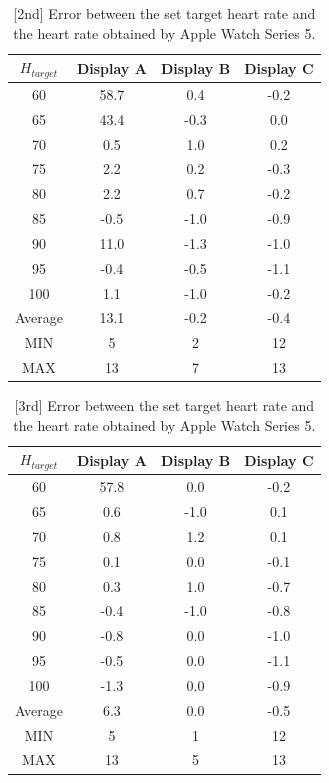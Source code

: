 \documentclass[sigchi,authordraft]{acmart}
\begin{document}
\begin{table}[!t]
  \centering
  \caption{[2nd] Error between the set target heart rate and the heart rate obtained by Apple Watch Series 5.}
  \begin{tabular}{c|c|c|c} \hline\hline
    $H_{target}$ & Display A & Display B & Display C \\ \hline
    60 & 58.7 & 0.4 & -0.2 \\
    65 & 43.4 & -0.3 & 0.0 \\
    70 & 0.5 & 1.0 & 0.2 \\
    75 & 2.2 & 0.2 & -0.3 \\
    80 & 2.2 & 0.7 & -0.2 \\
    85 & -0.5 & -1.0 & -0.9 \\
    90 & 11.0 & -1.3 & -1.0 \\
    95 & -0.4 & -0.5 & -1.1 \\
    100 & 1.1 & -1.0 & -0.2 \\ \hline
    Average & 13.1 & -0.2 & -0.4 \\ \hline \hline
    MIN & 5 & 2 & 12 \\ \hline
    MAX & 13 & 7 & 13 \\ \hline
  \end{tabular}
  \label{tab:series5_result_2nd}
\end{table}

\begin{table}[!t]
  \centering
  \caption{[3rd] Error between the set target heart rate and the heart rate obtained by Apple Watch Series 5.}
  \begin{tabular}{c|c|c|c} \hline\hline
    $H_{target}$ & Display A & Display B & Display C \\ \hline
    60 & 57.8 & 0.0 & -0.2 \\
    65 & 0.6 & -1.0 & 0.1 \\
    70 & 0.8 & 1.2 & 0.1 \\
    75 & 0.1 & 0.0 & -0.1 \\
    80 & 0.3 & 1.0 & -0.7 \\
    85 & -0.4 & -1.0 & -0.8 \\
    90 & -0.8 & 0.0 & -1.0 \\
    95 & -0.5 & 0.0 & -1.1 \\
    100 & -1.3 & 0.0 & -0.9 \\ \hline
    Average & 6.3 & 0.0 & -0.5 \\ \hline \hline
    MIN & 5 & 1 & 12 \\ \hline
    MAX & 13 & 5 & 13 \\ \hline
  \end{tabular}
  \label{tab:series5_result_3rd}
\end{table}
\end{document}
